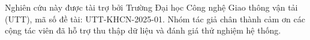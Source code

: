 Nghiên cứu này được tài trợ bởi Trường Đại học Công nghệ Giao thông vận tải (UTT), mã số đề tài: UTT-KHCN-2025-01. Nhóm tác giả chân thành cảm ơn các cộng tác viên đã hỗ trợ thu thập dữ liệu và đánh giá thử nghiệm hệ thống.
